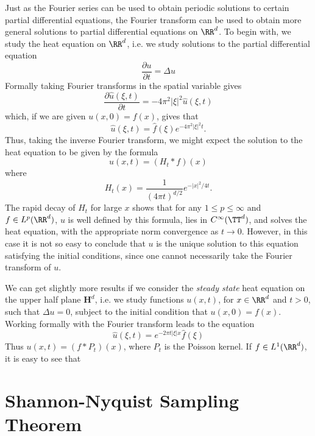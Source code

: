 Just as the Fourier series can be used to obtain periodic solutions to certain partial differential equations, the Fourier transform can be used to obtain more general solutions to partial differential equations on $\RR^d$. To begin with, we study the heat equation on $\RR^d$, i.e. we study solutions to the partial differential equation
%
\[ \frac{\partial u}{\partial t} = \Delta u \]
%
Formally taking Fourier transforms in the spatial variable gives
%
\[ \frac{\partial \widehat{u}(\xi,t)}{\partial t} = - 4 \pi^2 |\xi|^2 \widehat{u}(\xi,t) \]
%
which, if we are given $u(x,0) = f(x)$, gives that
%
\[ \widehat{u}(\xi,t) = \widehat{f}(\xi) e^{- 4 \pi^2 |\xi|^2 t}. \]
%
Thus, taking the inverse Fourier transform, we might expect the solution to the heat equation to be given by the formula
%
\[ u(x,t) = (H_t * f)(x) \]
%
where
%
\[ H_t(x) = \frac{1}{(4 \pi t)^{d/2}} e^{- |x|^2 / 4 t}. \]
%
The rapid decay of $H_t$ for large $x$ shows that for any $1 \leq p \leq \infty$ and $f \in L^p(\RR^d)$, $u$ is well defined by this formula, lies in $C^\infty(\TT^d)$, and solves the heat equation, with the appropriate norm convergence as $t \to 0$. However, in this case it is not so easy to conclude that $u$ is the unique solution to this equation satisfying the initial conditions, since one cannot necessarily take the Fourier transform of $u$.

We can get slightly more results if we consider the \emph{steady state} heat equation on the upper half plane $\mathbf{H}^d$, i.e. we study functions $u(x,t)$, for $x \in \RR^d$ and $t > 0$, such that $\Delta u = 0$, subject to the initial condition that $u(x,0) = f(x)$. Working formally with the Fourier transform leads to the equation
%
\[ \widehat{u}(\xi,t) = e^{-2 \pi t |\xi| x} \widehat{f}(\xi) \]
%
Thus $u(x,t) = (f * P_t)(x)$, where $P_t$ is the Poisson kernel. If $f \in L^1(\RR^d)$, it is easy to see that 


\section{Shannon-Nyquist Sampling Theorem}

